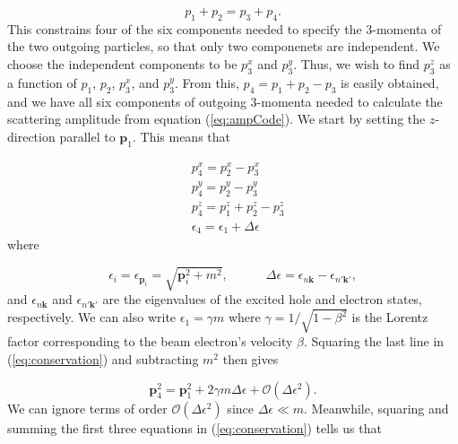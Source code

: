 \documentclass{article}
\begin{document}
\begin{equation}
    p_1 + p_2 = p_3 + p_4.
\end{equation}
%
This constrains four of the six components needed to specify the 3-momenta of the
two outgoing particles, so that only two componenets are independent.
We choose the independent components to be $p^x_3$ and $p^y_3$.  Thus, we wish
to find $p^z_3$ as a function of $p_1$, $p_2$, $p^x_3$, and $p^y_3$.
From this, $p_4 = p_1 + p_2 - p_3$ is easily obtained, and we have all six
components of outgoing 3-momenta needed to calculate the scattering amplitude
from equation (\ref{eq:ampCode}).
We start by setting the $z$-direction parallel to $\mathbf{p}_1$.
This means that

\begin{equation}
\label{eq:conservation}
    \begin{aligned}
        &p^x_4 = p^x_2 - p^x_3
        \\&p^y_4 = p^y_2 - p^y_3
        \\&p^z_4 = p^z_1 + p^z_2 - p^z_3
        \\&\epsilon_4 = \epsilon_1 + \Delta\epsilon
    \end{aligned}
\end{equation}
%
where

\begin{equation}
  \epsilon_i = \epsilon_{\mathbf{p}_i} = \sqrt{\mathbf{p}_i^2 + m^2},
  \qquad\quad
  \Delta\epsilon = \epsilon_{n\mathbf{k}} - \epsilon_{n'\mathbf{k'}},
\end{equation}
%
and $\epsilon_{n\mathbf{k}}$ and $\epsilon_{n'\mathbf{k'}}$ are the eigenvalues
of the excited hole and electron states, respectively.
We can also write $\epsilon_1 = \gamma m$ where $\gamma=1/\sqrt{1-\beta^2}$ is
the Lorentz factor corresponding to the beam electron's velocity $\beta$.
Squaring the last line in (\ref{eq:conservation}) and subtracting $m^2$ then
gives

\begin{equation}
  \mathbf{p}_4^2
  =
  \mathbf{p}_1^2 + 2\gamma m\Delta\epsilon + \mathcal{O}(\Delta\epsilon^2).
  \label{eq:p41}
\end{equation}
%
We can ignore terms of order $\mathcal{O}(\Delta\epsilon^2)$ since
$\Delta\epsilon\ll m$.  Meanwhile, squaring and summing the first three
equations in (\ref{eq:conservation}) tells us that
\end{document}

